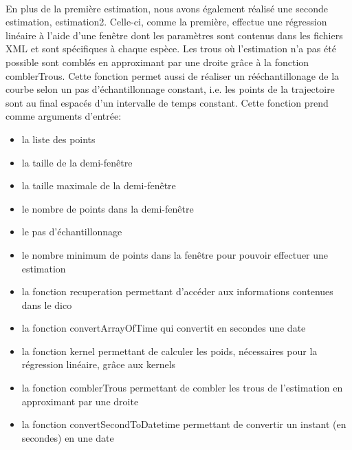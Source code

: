 \documentclass[11p, a4papert]{article}
\begin{document}
\paragraph{}
En plus de la première estimation, nous avons également réalisé une seconde estimation, estimation2. Celle-ci, comme la première, effectue une régression linéaire à l'aide d'une fenêtre dont les paramètres sont contenus dans les fichiers XML et sont spécifiques à chaque espèce. Les trous où l'estimation n'a pas été possible sont comblés en approximant par une droite grâce à la fonction comblerTrous. Cette fonction permet aussi de réaliser un rééchantillonage de la courbe selon un pas d'échantillonnage constant, i.e. les points de la trajectoire sont au final espacés d'un intervalle de temps constant.
Cette fonction prend comme arguments d'entrée:
\begin{itemize}
\item la liste des points
\item la taille de la demi-fenêtre
\item la taille maximale de la demi-fenêtre
\item le nombre de points dans la demi-fenêtre
\item le pas d'échantillonnage
\item le nombre minimum de points dans la fenêtre pour pouvoir effectuer une estimation
\item la fonction recuperation permettant d'accéder aux informations contenues dans le dico
\item la fonction convertArrayOfTime qui convertit en secondes une date
\item la fonction kernel permettant de calculer les poids, nécessaires pour la régression linéaire, grâce aux kernels
\item la fonction comblerTrous permettant de combler les trous de l'estimation en approximant par une droite
\item la fonction convertSecondToDatetime permettant de convertir un instant (en secondes) en une date
\end{itemize}
\vspace{0.5cm}
\end{document}
